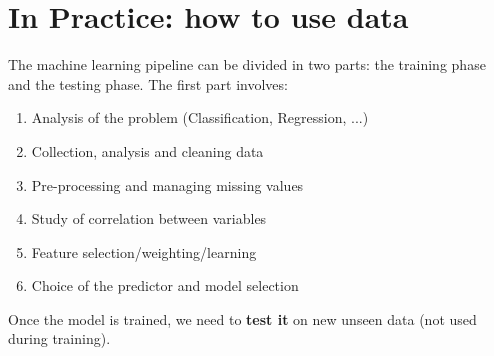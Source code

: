 \section{In Practice: how to use data}
The machine learning pipeline can be divided in two parts: the training phase and the testing phase. The first part involves:
\begin{enumerate}
    \item Analysis of the problem (Classification, Regression, ...)

    \item Collection, analysis and cleaning data

    \item Pre-processing and managing missing values

    \item Study of correlation between variables 

    \item Feature selection/weighting/learning

    \item Choice of the predictor and model selection
\end{enumerate}
Once the model is trained, we need to \textbf{test it} on new unseen data (not used during training).

